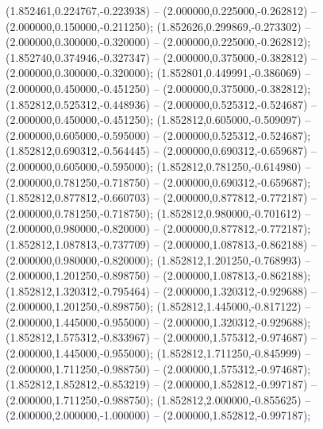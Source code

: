  (1.852461,0.224767,-0.223938) -- (2.000000,0.225000,-0.262812) -- (2.000000,0.150000,-0.211250);
 (1.852626,0.299869,-0.273302) -- (2.000000,0.300000,-0.320000) -- (2.000000,0.225000,-0.262812);
 (1.852740,0.374946,-0.327347) -- (2.000000,0.375000,-0.382812) -- (2.000000,0.300000,-0.320000);
 (1.852801,0.449991,-0.386069) -- (2.000000,0.450000,-0.451250) -- (2.000000,0.375000,-0.382812);
 (1.852812,0.525312,-0.448936) -- (2.000000,0.525312,-0.524687) -- (2.000000,0.450000,-0.451250);
 (1.852812,0.605000,-0.509097) -- (2.000000,0.605000,-0.595000) -- (2.000000,0.525312,-0.524687);
 (1.852812,0.690312,-0.564445) -- (2.000000,0.690312,-0.659687) -- (2.000000,0.605000,-0.595000);
 (1.852812,0.781250,-0.614980) -- (2.000000,0.781250,-0.718750) -- (2.000000,0.690312,-0.659687);
 (1.852812,0.877812,-0.660703) -- (2.000000,0.877812,-0.772187) -- (2.000000,0.781250,-0.718750);
 (1.852812,0.980000,-0.701612) -- (2.000000,0.980000,-0.820000) -- (2.000000,0.877812,-0.772187);
 (1.852812,1.087813,-0.737709) -- (2.000000,1.087813,-0.862188) -- (2.000000,0.980000,-0.820000);
 (1.852812,1.201250,-0.768993) -- (2.000000,1.201250,-0.898750) -- (2.000000,1.087813,-0.862188);
 (1.852812,1.320312,-0.795464) -- (2.000000,1.320312,-0.929688) -- (2.000000,1.201250,-0.898750);
 (1.852812,1.445000,-0.817122) -- (2.000000,1.445000,-0.955000) -- (2.000000,1.320312,-0.929688);
 (1.852812,1.575312,-0.833967) -- (2.000000,1.575312,-0.974687) -- (2.000000,1.445000,-0.955000);
 (1.852812,1.711250,-0.845999) -- (2.000000,1.711250,-0.988750) -- (2.000000,1.575312,-0.974687);
 (1.852812,1.852812,-0.853219) -- (2.000000,1.852812,-0.997187) -- (2.000000,1.711250,-0.988750);
 (1.852812,2.000000,-0.855625) -- (2.000000,2.000000,-1.000000) -- (2.000000,1.852812,-0.997187);
